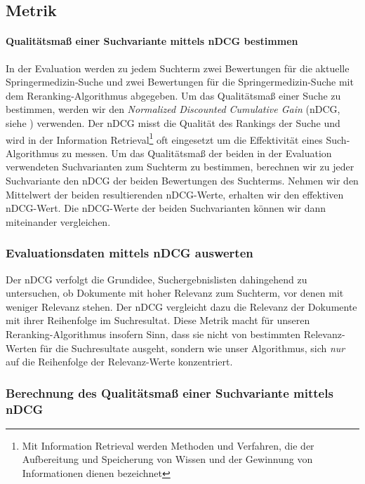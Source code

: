 \subsection{Metrik}
\label{sec:Evaluation:Aufbau:Metrik}

\paragraph{Qualitätsmaß einer Suchvariante mittels nDCG bestimmen}
In der Evaluation werden zu jedem Suchterm zwei Bewertungen für die aktuelle Springermedizin-Suche und zwei Bewertungen für die Springermedizin-Suche mit dem Reranking-Algorithmus abgegeben. Um das Qualitätsmaß einer Suche zu bestimmen, werden wir den \textit{Normalized Discounted Cumulative Gain} (nDCG, siehe \cite{nDCG}) verwenden. Der nDCG misst die Qualität des Rankings der Suche und wird in der Information Retrieval\footnote{Mit Information Retrieval werden Methoden und Verfahren, die der Aufbereitung und Speicherung von Wissen und der Gewinnung von Informationen dienen bezeichnet} oft eingesetzt um die Effektivität eines Such-Algorithmus zu messen.  Um das Qualitätsmaß der beiden in der Evaluation verwendeten Suchvarianten zum Suchterm zu bestimmen, berechnen wir zu jeder Suchvariante den nDCG der beiden Bewertungen des Suchterms. Nehmen wir den Mittelwert der beiden resultierenden nDCG-Werte, erhalten wir den effektiven nDCG-Wert. Die nDCG-Werte der beiden Suchvarianten können wir dann miteinander vergleichen.

\subsubsection{Evaluationsdaten mittels nDCG auswerten}
\label{sec:Evaluation:Aufbau:Metrik:EvaluationsdatennDCG}

Der nDCG verfolgt die Grundidee, Suchergebnislisten dahingehend zu untersuchen, ob Dokumente mit hoher Relevanz zum Suchterm, vor denen mit weniger Relevanz stehen. Der nDCG vergleicht dazu die Relevanz der Dokumente mit ihrer Reihenfolge im Suchresultat. Diese Metrik macht für unseren Reranking-Algorithmus insofern Sinn, dass sie nicht von bestimmten Relevanz-Werten für die Suchresultate ausgeht, sondern wie unser Algorithmus, sich \textit{nur} auf die Reihenfolge der Relevanz-Werte konzentriert. 

\subsubsection{Berechnung des Qualitätsmaß einer Suchvariante mittels nDCG}
\label{sec:Evaluation:Aufbau:Metrik:BerechnungnDCG}

